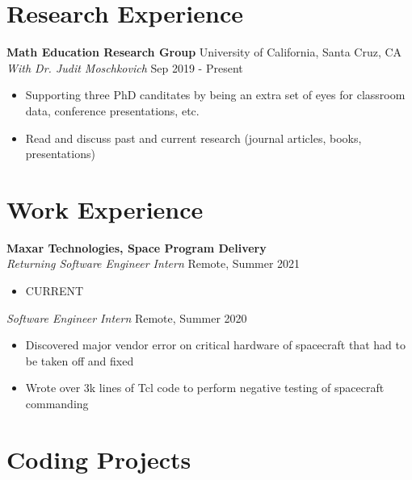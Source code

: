 \documentclass[10pt,letterpaper]{article}
\begin{document}
\section*{Research Experience} \hrulefill

\textbf{Math Education Research Group} \hfill University of California, Santa Cruz, CA\\
\textit{With Dr. Judit Moschkovich} \hfill Sep 2019 - Present
\begin{itemize}
    \item Supporting three PhD canditates by being an extra set of eyes for classroom data, conference presentations, etc.
    \item Read and discuss past and current research (journal articles, books, presentations)
\end{itemize}


\section*{Work Experience} \hrulefill 

\textbf{Maxar Technologies, Space Program Delivery}\\
\textit{Returning Software Engineer Intern} \hfill Remote, Summer 2021
\begin{itemize}
    \item CURRENT 
\end{itemize}
\textit{Software Engineer Intern} \hfill Remote, Summer 2020
\begin{itemize}
    \item Discovered major vendor error on critical hardware of spacecraft that had to be taken off and fixed
    \item Wrote over 3k lines of Tcl code to perform negative testing of spacecraft commanding
\end{itemize}
%
%

\section*{Coding Projects} \hrulefill 
\end{document}
